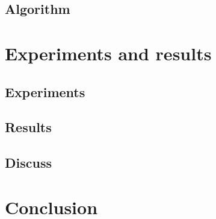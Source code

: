 \documentclass{techrep} %
\begin{document}
\section{Algorithm}

\chapter{Experiments and results}
\section{Experiments}
\section{Results}
\section{Discuss}
\chapter*{Conclusion}

 \nocite{*}
\end{document}
